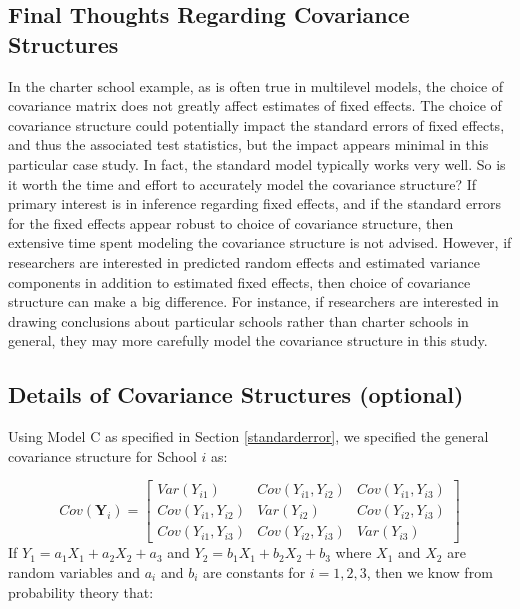 \documentclass[
]{krantz}
\begin{document}
\hypertarget{final-thoughts-regarding-covariance-structures}{%
\subsection{Final Thoughts Regarding Covariance Structures}\label{final-thoughts-regarding-covariance-structures}}

In the charter school example, as is often true in multilevel models, the choice of covariance matrix does not greatly affect estimates of fixed effects. The choice of covariance structure could potentially impact the standard errors of fixed effects, and thus the associated test statistics, but the impact appears minimal in this particular case study. In fact, the standard model typically works very well. So is it worth the time and effort to accurately model the covariance structure? If primary interest is in inference regarding fixed effects, and if the standard errors for the fixed effects appear robust to choice of covariance structure, then extensive time spent modeling the covariance structure is not advised. However, if researchers are interested in predicted random effects and estimated variance components in addition to estimated fixed effects, then choice of covariance structure can make a big difference. For instance, if researchers are interested in drawing conclusions about particular schools rather than charter schools in general, they may more carefully model the covariance structure in this study.

\hypertarget{optionalcov}{%
\subsection{Details of Covariance Structures (optional)}\label{optionalcov}}

Using Model C as specified in Section \ref{standarderror}, we specified the general covariance structure for School \(i\) as:

\[ Cov(\mathbf{Y}_i) =  \left[
          \begin{array}{cccc}
            Var(Y_{i1}) & Cov(Y_{i1},Y_{i2}) & Cov(Y_{i1},Y_{i3}) \\
            Cov(Y_{i1},Y_{i2}) & Var(Y_{i2}) & Cov(Y_{i2},Y_{i3}) \\
            Cov(Y_{i1},Y_{i3}) & Cov(Y_{i2},Y_{i3}) & Var(Y_{i3})
          \end{array} \right] \]
If \(Y_1 = a_1 X_1 + a_2 X_2 + a_3\) and \(Y_2 = b_1 X_1 + b_2 X_2 + b_3\) where \(X_1\) and \(X_2\) are random variables and \(a_i\) and \(b_i\) are constants for \(i=1,2,3\), then we know from probability theory that:
\end{document}
